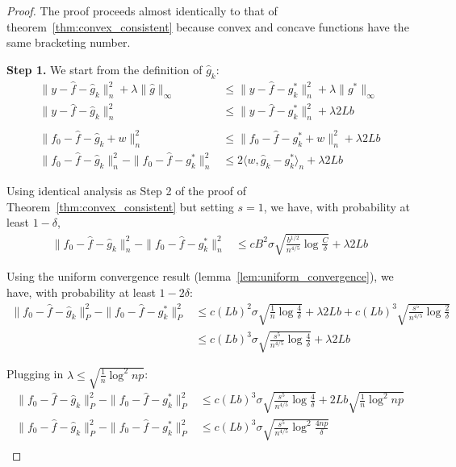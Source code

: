 \begin{proof}
The proof proceeds almost identically to that of theorem~\ref{thm:convex_consistent} because convex and concave functions have the same bracketing number.

\textbf{Step 1.} We start from the definition of $\hat{g}_k$:
\begin{align*}
\| y - \hat{f} - \hat{g}_k \|_n^2 + \lambda \| \hat{g} \|_\infty &\leq
   \| y - \hat{f} - g^*_k \|_n^2 + \lambda \| g^* \|_\infty \\
\| y - \hat{f} - \hat{g}_k \|_n^2 &\leq \| y - \hat{f} - g^*_k \|_n^2 + \lambda 2 Lb \\
 &\\
\| f_0 - \hat{f} - \hat{g}_k + w\|_n^2 & \leq \| f_0 - \hat{f} - g^*_k + w \|_n^2 
   +\lambda 2 Lb \\
\| f_0 - \hat{f} - \hat{g}_k \|_n^2 - \|f_0 -\hat{f} - g^*_k\|_n^2 &\leq
   2 \langle w, \hat{g}_k - g^*_k \rangle_n + \lambda 2Lb
\end{align*}

Using identical analysis as Step 2 of the proof of Theorem~\ref{thm:convex_consistent} but setting $s=1$, we have, with probability at least $1-\delta$,
\begin{align*}
\| f_0 - \hat{f} - \hat{g}_k \|_n^2 - \|f_0 - \hat{f} - g^*_k \|_n^2 &\leq
  c B^2 \sigma \sqrt{ \frac{b^{1/2}}{n^{4/5}} \log \frac{C}{\delta} }+ \lambda 2 Lb
\end{align*}

Using the uniform convergence result (lemma~\ref{lem:uniform_convergence}), we have, with probability at least $1-2\delta$:
\begin{align*}
\| f_0 - \hat{f} - \hat{g}_k \|_P^2 - \|f_0 - \hat{f} - g^*_k \|_P^2 &\leq
  c (Lb)^2 \sigma \sqrt{ \frac{1}{n} \log \frac{4}{\delta} }+ \lambda 2 Lb +
  c (Lb)^3 \sqrt{\frac{s^5}{n^{4/5}} \log \frac{2}{\delta} } \\
 &\leq c (Lb)^3\sigma \sqrt{\frac{s^5}{n^{4/5}} \log \frac{4}{\delta}}+ \lambda 2 Lb
\end{align*}

Plugging in $\lambda \leq \sqrt{ \frac{1}{n} \log^2 np}$:
\begin{align*}
\| f_0 - \hat{f} - \hat{g}_k \|_P^2 - \|f_0 - \hat{f} - g^*_k \|_P^2 &
\leq c (Lb)^3\sigma \sqrt{\frac{s^5}{n^{4/5}} \log \frac{4}{\delta}}+ 
    2Lb \sqrt{\frac{1}{n} \log^2 np}\\
\| f_0 - \hat{f} - \hat{g}_k \|_P^2 - \|f_0 - \hat{f} - g^*_k \|_P^2 &
\leq c (Lb)^3\sigma \sqrt{\frac{s^5}{n^{4/5}} \log^2 \frac{4np}{\delta}} \\
\end{align*}


\end{proof}

